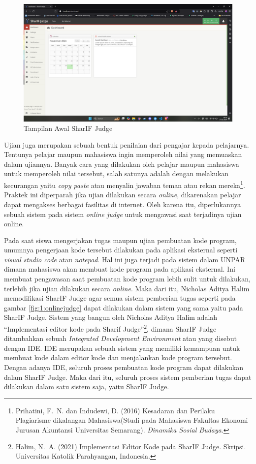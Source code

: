 \documentclass[a4paper,twoside]{article}
\begin{document}
\begin{figure}[H]
	\centering
	\includegraphics[width=\textwidth]{dashboard.png}
	\caption[Tampilan Awal SharIF Judge]{Tampilan Awal SharIF Judge}
	\label{fig:1:dashboardpng}
\end{figure}

\vspace{-0.25cm}

Ujian juga merupakan sebuah bentuk penilaian dari pengajar kepada pelajarnya. Tentunya pelajar maupun mahasiswa ingin memperoleh nilai yang memuaskan dalam ujiannya. Banyak cara yang dilakukan oleh pelajar maupun mahasiswa untuk memperoleh nilai tersebut, salah satunya adalah dengan melakukan kecurangan yaitu \textit{copy paste} atau menyalin jawaban teman atau rekan mereka\footnote{Prihatini, F.~N. dan Indudewi, D. (2016) {Kesadaran dan Perilaku Plagiarisme dikalangan Mahasiswa(Studi pada Mahasiswa Fakultas Ekonomi Jurusan Akuntansi Universitas Semarang)}. {\em Dinamika Sosial Budaya}.}. Praktek ini diperparah jika ujian dilakukan secara \textit{online}, dikarenakan pelajar dapat mengakses berbagai fasilitas di internet. Oleh karena itu, diperlukannya sebuah sistem pada sistem \textit{online judge} untuk mengawasi saat terjadinya ujian online.

Pada saat siswa mengerjakan tugas maupun ujian pembuatan kode program, umumnya pengerjaan kode tersebut dilakukan pada aplikasi eksternal seperti \textit{visual studio code} atau \textit{notepad}. Hal ini juga terjadi pada sistem dalam UNPAR dimana mahasiswa akan membuat kode program pada aplikasi eksternal. Ini membuat pengawasan saat pembuatan kode program lebih sulit untuk dilakukan, terlebih jika ujian dilakukan secara \textit{online}. Maka dari itu, Nicholas Aditya Halim memodifikasi SharIF Judge agar semua sistem pemberian tugas seperti pada gambar \ref{fig:1:onlinejudge} dapat dilakukan dalam sistem yang sama yaitu pada SharIF Judge. Sistem yang bangun oleh Nicholas Aditya Halim adalah ``Implementasi editor kode pada Sharif Judge''\footnote{Halim, N.~A. (2021) {Implementasi Editor Kode pada SharIF Judge}. Skripsi. Universitas Katolik Parahyangan,  Indonesia.}, dimana SharIF Judge ditambahkan sebuah \textit{Integrated Development Environment} atau yang disebut dengan IDE. IDE merupakan sebuah sistem yang memiliki kemampuan untuk membuat kode dalam editor kode dan menjalankan kode program tersebut. Dengan adanya IDE, seluruh proses pembuatan kode program dapat dilakukan dalam SharIF Judge. Maka dari itu, seluruh proses sistem pemberian tugas dapat dilakukan dalam satu sistem saja, yaitu SharIF Judge.
\end{document}
